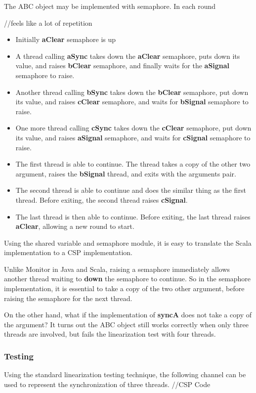 \documentclass{article}
\begin{document}
The ABC object may be implemented with semaphore. In each round

//feels like a lot of repetition
\begin{itemize}
    \item Initially \textbf{aClear} semaphore is up
    \item A thread calling \textbf{aSync} takes down the \textbf{aClear} semaphore, puts down its value, and raises \textbf{bClear} semaphore, and finally waits for the \textbf{aSignal} semaphore to raise.
    \item Another thread calling \textbf{bSync} takes down the \textbf{bClear} semaphore, put down its value, and raises \textbf{cClear} semaphore, and waits for \textbf{bSignal} semaphore to raise.
    \item One more thread calling \textbf{cSync} takes down the \textbf{cClear} semaphore, put down its value, and raises \textbf{aSignal} semaphore, and waits for \textbf{cSignal} semaphore to raise.
    \item The first thread is able to continue. The thread takes a copy of the other two argument, raises the \textbf{bSignal} thread, and exits with the arguments pair.
    \item The second thread is able to continue and does the similar thing as the first thread. Before exiting, the second thread raises \textbf{cSignal}.
    \item The last thread is then able to continue. Before exiting, the last thread raises \textbf{aClear}, allowing a new round to start.
\end{itemize}

Using the shared variable and semaphore module, it is easy to translate the Scala implementation to a CSP implementation. 

Unlike Monitor in Java and Scala, raising a semaphore immediately allows another thread waiting to \textbf{down} the semaphore to continue. So in the semaphore implementation, it is essential to take a copy of the two other argument, before raising the semaphore for the next thread. 

On the other hand, what if the implementation of \textbf{syncA} does not take a copy of the argument? It turns out the ABC object still works correctly when only three threads are involved, but fails the linearization test with four threads.

\subsubsection{Testing}
Using the standard linearization testing technique, the following channel can be used to represent the synchronization of three threads.
//CSP Code
\end{document}

